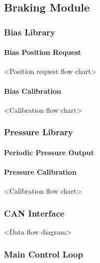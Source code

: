 \subsection{Braking Module}


\subsubsection{Bias Library}


\paragraph{Bias Position Request}

<Position request flow chart>


\paragraph{Bias Calibration}

<Calibration flow chart>


\subsubsection{Pressure Library}


\paragraph{Periodic Pressure Output}


\paragraph{Pressure Calibration}

<Calibration flow chart>


\subsubsection{CAN Interface}

<Data flow diagram>


\subsubsection{Main Control Loop}